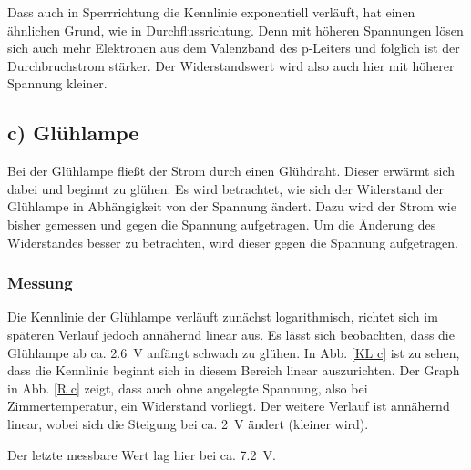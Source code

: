 \documentclass[11pt,a4paper,titlepage, ngerman]{article}
\begin{document}
				Dass auch in Sperrrichtung die Kennlinie exponentiell verläuft, hat einen ähnlichen Grund, wie in Durchflussrichtung.
				Denn mit höheren Spannungen lösen sich auch mehr Elektronen aus dem Valenzband des p-Leiters und folglich ist der Durchbruchstrom stärker.
				Der Widerstandswert wird also auch hier mit höherer Spannung kleiner. 
				
		\subsection{c) Glühlampe} 
			
			Bei der Glühlampe fließt der Strom durch einen Glühdraht. Dieser erwärmt sich dabei und beginnt zu glühen. Es wird betrachtet, wie sich der Widerstand der Glühlampe in Abhängigkeit von der Spannung ändert. Dazu wird der Strom wie bisher gemessen und gegen die Spannung aufgetragen.
			Um die Änderung des Widerstandes besser zu betrachten, wird dieser gegen die Spannung aufgetragen. 
			
			\subsubsection*{Messung}
				
				Die Kennlinie der Glühlampe verläuft zunächst logarithmisch, richtet sich im späteren Verlauf jedoch annähernd linear aus. Es lässt sich beobachten, dass die Glühlampe ab ca. \SI{2.6}{\V} anfängt schwach zu glühen. In Abb. \ref{KL c} ist zu sehen, dass die Kennlinie beginnt sich in diesem Bereich linear auszurichten.
				Der Graph in Abb. \ref{R c} zeigt, dass auch ohne angelegte Spannung, also bei Zimmertemperatur, ein Widerstand vorliegt. Der weitere Verlauf ist annähernd linear, wobei sich die Steigung bei ca. \SI{2}{\V} ändert (kleiner wird).
				
				Der letzte messbare Wert lag hier bei ca. \SI{7.2}{\V}.
				
\end{document}
